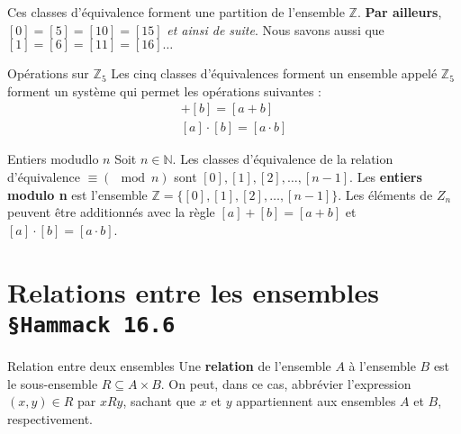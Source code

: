 \documentclass[16pt]{report}
\begin{document}
\begin{multicols*}{2}
                \begin{note}{}{}
                    Ces classes d'équivalence forment une partition de l'ensemble $\mathbb{Z}$. \textbf{Par ailleurs},
                    $[0] = [5] = [10] = [15]$ \textit{et ainsi de suite}. Nous savons aussi que 
                    $[1] = [6] = [11] = [16]\dots$     
                \end{note}


                \begin{Concept}{Opérations sur $\mathbb{Z}_5$}{}
                        Les cinq classes d'équivalences forment un ensemble appelé $\mathbb{Z}_5$
                        forment un système qui permet les opérations suivantes : 
                        \begin{align*}
                                        [a] + [b] = [a + b] \\ 
                                        [a] \cdot [b] = [a \cdot b]
                        \end{align*}                        
                \end{Concept}


                \begin{Definitionx}{Entiers modudlo $n$}{}
                        Soit $n \in \mathbb{N}$. Les classes d'équivalence de la relation d'équivalence 
                        $\equiv (\mod n)$ sont $[0], [1], [2], \dots, [n-1]$. Les \textbf{entiers modulo n} est 
                        l'ensemble $\mathbb{Z} = \{ [0], [1], [2], \dots, [n-1] \}$. Les éléments de $Z_n$ peuvent 
                        être additionnés avec la règle $[a] + [b] = [a + b]$ et $[a] \cdot [b] = [a \cdot b]$. 
                         
                \end{Definitionx}


        \section{Relations entre les ensembles \texttt{ \small{\S Hammack 16.6}}}


            \begin{Definitionx}{Relation entre deux ensembles}{}
                Une \textbf{relation} de l'ensemble $A$ à l'ensemble $B$ est le sous-ensemble 
                $R \subseteq A \times B$. On peut, dans ce cas, abbrévier l'expression 
                $(x, y) \in R$ par $xRy$, sachant que $x$ et $y$ appartiennent aux ensembles 
                $A$ et $B$, respectivement.
            \end{Definitionx}



\end{multicols*}
\end{document}
